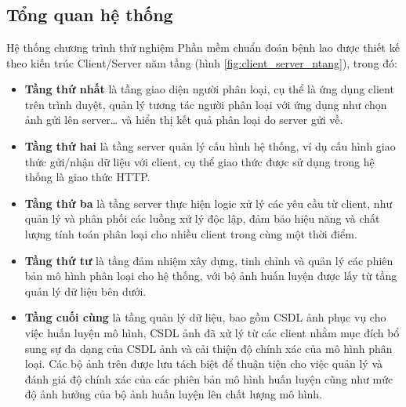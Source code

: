 \setcounter{chapter}{2}
\chapter{\tenchuongiii}
\section{Tổng quan hệ thống}
Hệ thống chương trình thử nghiệm Phần mềm chuẩn đoán bệnh lao được thiết kế theo kiến trúc Client/Server năm tầng (hình \ref{fig:client_server_ntang}), trong đó:
\begin{itemize}
	\item {\bf Tầng thứ nhất} là tầng giao diện người phân loại, cụ thể là ứng dụng client trên trình duyệt, quản lý tương tác người phân loại với ứng dụng như chọn ảnh gửi lên server… và hiển thị kết quả phân loại do server gửi về.
	\item {\bf Tầng thứ hai} là tầng server quản lý cấu hình hệ thống, ví dụ cấu hình giao thức gửi/nhận dữ liệu với client, cụ thể giao thức được sử dụng trong hệ thống là giao thức HTTP.
	\item {\bf Tầng thứ ba} là tầng server thực hiện logic xử lý các yêu cầu từ client, như	quản lý và phân phối các luồng xử lý độc lập, đảm bảo hiệu năng và chất lượng tính toán phân loại cho nhiều client trong cùng một thời điểm.
	\item {\bf Tầng thứ tư} là tầng đảm nhiệm xây dựng, tinh chỉnh và quản lý các phiên	bản mô hình phân loại cho hệ thống, với bộ ảnh huấn luyện được lấy từ tầng quản lý dữ liệu bên dưới.
	\item {\bf Tầng cuối cùng} là tầng quản lý dữ liệu, bao gồm CSDL ảnh phục vụ cho việc huấn luyện mô hình, CSDL ảnh đã xử lý từ các client nhằm mục đích bổ sung sự	đa dạng của CSDL ảnh và cải thiện độ chính xác của mô hình phân loại. Các bộ ảnh trên được lưu tách biệt để thuận tiện cho việc quản lý và đánh giá độ chính xác của các
	phiên bản mô hình huấn luyện cũng như mức độ ảnh hưởng của bộ ảnh huấn luyện lên chất lượng mô hình.
\end{itemize}
